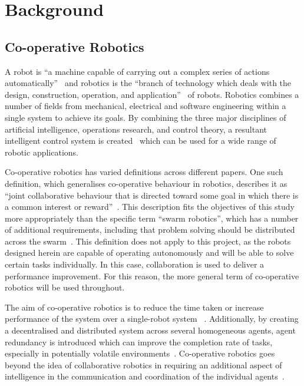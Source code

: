 
\chapter{Background}\label{litreview}

\section{Co-operative Robotics}\label{litreview/robotics}
A robot is ``a machine capable of carrying out a complex series of actions
automatically''~\cite{robotdef} and robotics is the ``branch of technology which deals with the design, construction,
operation, and application''~\cite{roboticsdef} of robots. Robotics combines a number of fields from mechanical,
electrical and software engineering within a single system to achieve its goals. By
combining the three major disciplines of artificial intelligence, operations
research, and control theory, a resultant intelligent control system is created~\cite{saridis1983intelligent} which can be
used for a wide range of robotic applications.

Co-operative robotics has varied definitions across different papers. One such
definition, which generalises co-operative behaviour in robotics, describes it
as ``joint collaborative behaviour that is directed toward some goal in which
there is a common interest or reward''~\cite{barnes1991behaviour}. This
description fits the objectives of this study more appropriately than the
specific term ``swarm robotics'',  which has a number of additional requirements,
including that problem solving should be distributed across the swarm~\cite{sahin04}. This definition does not apply to this project, as the robots
designed herein are capable of operating autonomously and will be able to solve
certain tasks individually. In this case, collaboration is used to deliver a
performance improvement. For this reason, the more general term of co-operative
robotics will be used throughout.

The aim of co-operative robotics is to reduce the time taken or
increase performance  of the system over a single-robot system~
\cite{premvuti1990consideration}. Additionally, by creating a decentralised and
distributed system across several homogeneous agents, agent redundancy is
introduced which can improve the completion rate of tasks, especially in
potentially volatile environments~\cite{beckers1994local, parker95}.
Co-operative robotics goes beyond the idea of collaborative robotics in
requiring an additional aspect of intelligence in the communication and
coordination of the individual agents~\cite{cao1995cooperative}.

